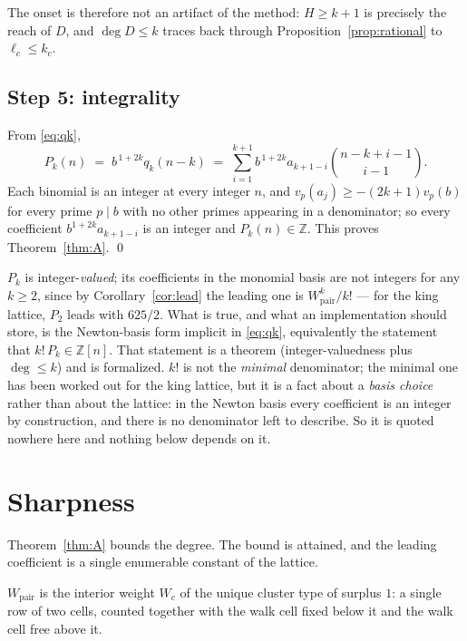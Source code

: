 \documentclass[11pt]{article}
\newcommand{\Wp}{W_{\mathrm{pair}}}
\newcommand{\Z}{\mathbb{Z}}
\begin{document}
The onset is therefore not an artifact of the method: $H \ge k+1$ is precisely
the reach of $D$, and $\deg D \le k$ traces back through
Proposition~\ref{prop:rational} to $\ell_c \le k_c$.

\subsection*{Step 5: integrality}

From \eqref{eq:qk},
\[
  P_k(n) \;=\; b^{\,1+2k} q_k(n-k)
  \;=\; \sum_{i=1}^{k+1} b^{\,1+2k} a_{k+1-i}\binom{n-k+i-1}{\,i-1\,}.
\]
Each binomial is an integer at every integer $n$, and
$v_p(a_j) \ge -(2k+1)v_p(b)$ for every prime $p \mid b$ with no other primes
appearing in a denominator; so every coefficient $b^{1+2k}a_{k+1-i}$ is an
integer and $P_k(n) \in \Z$. This proves Theorem~\ref{thm:A}. \qed

\begin{remark}
$P_k$ is integer-\emph{valued}; its coefficients in the monomial basis are not
integers for any $k \ge 2$, since by Corollary~\ref{cor:lead} the leading one is
$\Wp^k/k!$ --- for the king lattice, $P_2$ leads with $625/2$. What is true, and
what an implementation should store, is the Newton-basis form implicit in
\eqref{eq:qk}, equivalently the statement that $k!\,P_k \in \Z[n]$. That
statement is a theorem (integer-valuedness plus $\deg \le k$) and is formalized.
$k!$ is not the \emph{minimal} denominator; the minimal one has been worked out
for the king lattice, but it is a fact about a \emph{basis choice} rather than
about the lattice: in the Newton basis every coefficient is an integer by
construction, and there is no denominator left to describe. So it is quoted
nowhere here and nothing below depends on it.
\end{remark}

\section{Sharpness}
\label{sec:sharp}

Theorem~\ref{thm:A} bounds the degree. The bound is attained, and the leading
coefficient is a single enumerable constant of the lattice.

\begin{definition}
\label{def:pair}
$\Wp$ is the interior weight $W_c$ of the unique cluster type of surplus $1$: a
single row of two cells, counted together with the walk cell fixed below it and
the walk cell free above it.
\end{definition}
\end{document}
